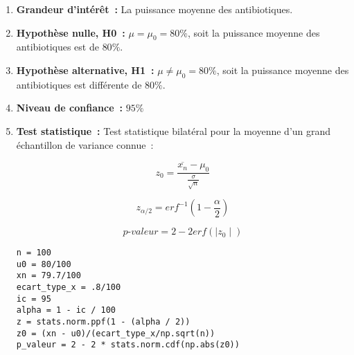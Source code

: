 \begin{enumerate}
    \item \textbf{Grandeur d'intérêt~:} La puissance moyenne des antibiotiques.
    \vspace{.1cm}
    \item \textbf{Hypothèse nulle, H0~:} $\mu = \mu_{0} = 80\%$, soit la puissance moyenne des antibiotiques est de $80\%$.
    \vspace{.1cm}
    \item \textbf{Hypothèse alternative, H1~:} $\mu \neq \mu_{0} = 80\%$, soit la puissance moyenne des antibiotiques est différente de $80\%$.
    \vspace{.1cm}
    \item \textbf{Niveau de confiance~:} $95\%$
    \vspace{.1cm}
   \item \textbf{Test statistique~:}
        Test statistique bilatéral pour la moyenne d'un grand échantillon de variance connue~:
        \clearpage

        \begin{figure}[!h]
            \centering
            \begin{minipage}{.48\linewidth}
                \begin{equation}
                    z_{0} = \frac{\overline{x_{n}} - \mu_{0}}{\frac{\sigma}{\sqrt{n}}}
                    \label{eq:test_norm_var_inconnue}
                \end{equation}
            \end{minipage}\hfill\vline
            \begin{minipage}{.48\linewidth}
                \begin{equation}
                    z_{\alpha/2} = erf^{-1}(1 - \frac{\alpha}{2})
                    \label{eq:p-valeur_test_norm_var_inconnue}
                \end{equation}
            \end{minipage}
        \end{figure}

        \begin{equation}
            \textit{p-valeur} = 2 - 2 erf(\mid z_{0} \mid) 
            \label{eq:p-valeur_test_norm_var_inconnue}
        \end{equation}

        \vspace{.2cm}

\begin{lstlisting}[style=myPython, caption=Code Python question 3, frame=lines]
n = 100
u0 = 80/100
xn = 79.7/100
ecart_type_x = .8/100
ic = 95
alpha = 1 - ic / 100
z = stats.norm.ppf(1 - (alpha / 2))
z0 = (xn - u0)/(ecart_type_x/np.sqrt(n))
p_valeur = 2 - 2 * stats.norm.cdf(np.abs(z0))


\end{lstlisting}
\end{enumerate}

